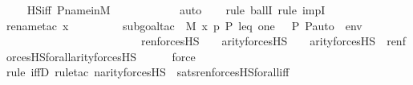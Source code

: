 \begin{isabellebody}
\ \ \isamarkupfalse%
\ HS{\isacharunderscore}{\kern0pt}iff\ P{\isacharunderscore}{\kern0pt}name{\isacharunderscore}{\kern0pt}in{\isacharunderscore}{\kern0pt}M\ \isanewline
\ \ \ \ \ \ \ \ \ \isamarkupfalse%
\ auto{\isacharbrackleft}{\kern0pt}{}{\isacharbrackright}{\kern0pt}\isanewline
\ \ \ \isamarkupfalse%
{\isacharparenleft}{\kern0pt}rule\ ballI{\isacharcomma}{\kern0pt}\ rule\ impI{\isacharparenright}{\kern0pt}\isanewline
\ \ \isamarkupfalse%
{\isacharparenleft}{\kern0pt}rename{\isacharunderscore}{\kern0pt}tac\ x{\isacharcomma}{\kern0pt}\ \isanewline
\ \ \ \ \ \ \ \ subgoal{\isacharunderscore}{\kern0pt}tac\ {\isachardoublequoteopen}\ M{\isacharcomma}{\kern0pt}\ {\isacharbrackleft}{\kern0pt}x{\isacharcomma}{\kern0pt}\ p{\isacharcomma}{\kern0pt}\ P{\isacharcomma}{\kern0pt}\ leq{\isacharcomma}{\kern0pt}\ one{\isacharcomma}{\kern0pt}\ {\isasymlangle}{\isasymF}{\isacharcomma}{\kern0pt}\ {\isasymG}{\isacharcomma}{\kern0pt}\ P{\isacharcomma}{\kern0pt}\ P{\isacharunderscore}{\kern0pt}auto{\isasymrangle}{\isacharbrackright}{\kern0pt}\ {\isacharat}{\kern0pt}\ env\ {\isasymTurnstile}\ \isanewline
\ \ \ \ \ \ \ \ \ \ \ \ \ \ \ \ \ \ \ \ \ \ \ \ ren{\isacharparenleft}{\kern0pt}forcesHS{\isacharprime}{\kern0pt}{\isacharparenleft}{\kern0pt}{\isasymphi}{\isacharparenright}{\kern0pt}{\isacharparenright}{\kern0pt}\ {\isacharbackquote}{\kern0pt}\ {\isacharparenleft}{\kern0pt}{}\ {\isasymunion}\ arity{\isacharparenleft}{\kern0pt}forcesHS{\isacharprime}{\kern0pt}{\isacharparenleft}{\kern0pt}{\isasymphi}{\isacharparenright}{\kern0pt}{\isacharparenright}{\kern0pt}{\isacharparenright}{\kern0pt}\ {\isacharbackquote}{\kern0pt}\ {\isacharparenleft}{\kern0pt}{}\ {\isasymunion}\ arity{\isacharparenleft}{\kern0pt}forcesHS{\isacharprime}{\kern0pt}{\isacharparenleft}{\kern0pt}{\isasymphi}{\isacharparenright}{\kern0pt}{\isacharparenright}{\kern0pt}{\isacharparenright}{\kern0pt}\ {\isacharbackquote}{\kern0pt}\ ren{\isacharunderscore}{\kern0pt}forcesHS{\isacharunderscore}{\kern0pt}forall{\isacharparenleft}{\kern0pt}arity{\isacharparenleft}{\kern0pt}forcesHS{\isacharprime}{\kern0pt}{\isacharparenleft}{\kern0pt}{\isasymphi}{\isacharparenright}{\kern0pt}{\isacharparenright}{\kern0pt}{\isacharparenright}{\kern0pt}{\isachardoublequoteclose}{\isacharparenright}{\kern0pt}\isanewline
\ \ \ \ \isamarkupfalse%
\ force\isanewline
\ \ \ \isamarkupfalse%
{\isacharparenleft}{\kern0pt}rule\ iffD{}{\isacharcomma}{\kern0pt}\ rule{\isacharunderscore}{\kern0pt}tac\ n{\isacharequal}{\kern0pt}{\isachardoublequoteopen}arity{\isacharparenleft}{\kern0pt}forcesHS{\isacharprime}{\kern0pt}{\isacharparenleft}{\kern0pt}{\isasymphi}{\isacharparenright}{\kern0pt}{\isacharparenright}{\kern0pt}{\isachardoublequoteclose}\ \ sats{\isacharunderscore}{\kern0pt}ren{\isacharunderscore}{\kern0pt}forcesHS{\isacharunderscore}{\kern0pt}forall{\isacharunderscore}{\kern0pt}iff{\isacharparenright}{\kern0pt}\isanewline

\end{isabellebody}
